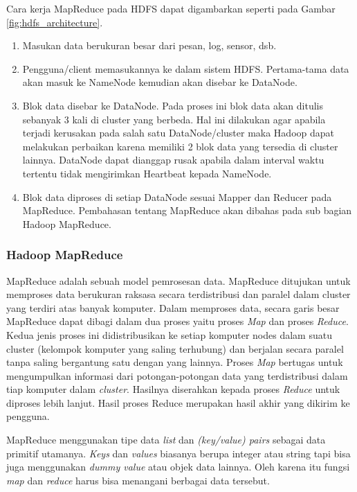 Cara kerja MapReduce pada HDFS dapat digambarkan seperti pada Gambar \ref{fig:hdfs_architecture}. 
\begin{enumerate}
	\item Masukan data berukuran besar dari pesan, log, sensor, dsb.
	\item Pengguna/client memasukannya ke dalam sistem HDFS. Pertama-tama data akan masuk ke NameNode kemudian akan disebar ke DataNode.  
	\item Blok data disebar ke DataNode. Pada proses ini blok data akan ditulis sebanyak 3 kali di cluster yang berbeda. Hal ini dilakukan agar apabila terjadi kerusakan pada salah satu DataNode/cluster maka Hadoop dapat melakukan perbaikan karena memiliki 2 blok data yang tersedia di cluster lainnya. DataNode dapat dianggap rusak apabila dalam interval waktu tertentu tidak mengirimkan Heartbeat kepada NameNode.
	\item Blok data diproses di setiap DataNode sesuai Mapper dan Reducer pada MapReduce. Pembahasan tentang MapReduce akan dibahas pada sub bagian Hadoop MapReduce. 
\end{enumerate}
	
\subsubsection{Hadoop MapReduce}
\label{sec:hadoop_mapreduce}
MapReduce adalah sebuah model pemrosesan data\cite{Lam:2010:HA:1965594}. MapReduce ditujukan untuk memproses data berukuran raksasa secara terdistribusi dan paralel dalam cluster yang terdiri atas banyak komputer. Dalam memproses data, secara garis besar MapReduce dapat dibagi dalam dua proses yaitu proses \textit{Map} dan proses \textit{Reduce}. Kedua jenis proses ini didistribusikan ke setiap komputer nodes dalam suatu cluster (kelompok komputer yang saling terhubung) dan berjalan secara paralel tanpa saling bergantung satu dengan yang lainnya. Proses \textit{Map} bertugas untuk mengumpulkan informasi dari potongan-potongan data yang terdistribusi dalam tiap komputer dalam \textit{cluster}. Hasilnya diserahkan kepada proses \textit{Reduce} untuk diproses lebih lanjut. Hasil proses Reduce merupakan hasil akhir yang dikirim ke pengguna. \cite{Dean:2008:MSD:1327452.1327492}

MapReduce menggunakan tipe data \textit{list} dan \textit{(key/value) pairs} sebagai data primitif utamanya. \textit{Keys} dan \textit{values} biasanya berupa integer atau string tapi bisa juga menggunakan \textit{dummy value} atau objek data lainnya. Oleh karena itu fungsi \textit{map} dan \textit{reduce} harus bisa menangani berbagai data tersebut.

